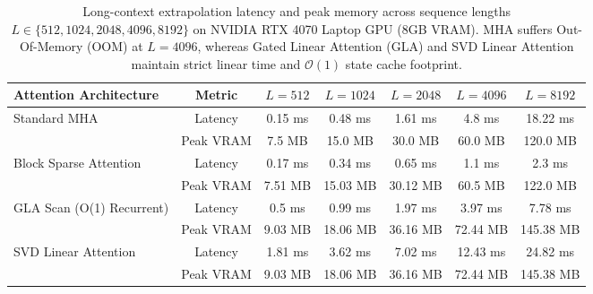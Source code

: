 
\begin{table}[t]
\centering
\caption{Long-context extrapolation latency and peak memory across sequence lengths $L \in \{512, 1024, 2048, 4096, 8192\}$ on NVIDIA RTX 4070 Laptop GPU (8GB VRAM). MHA suffers Out-Of-Memory (OOM) at $L=4096$, whereas Gated Linear Attention (GLA) and SVD Linear Attention maintain strict linear time and $\mathcal{O}(1)$ state cache footprint.}
\label{tab:long_context_scaling}
\small
\begin{tabular}{lcccccc}
\toprule
\textbf{Attention Architecture} & \textbf{Metric} & $L=512$ & $L=1024$ & $L=2048$ & $L=4096$ & $L=8192$ \\
\midrule
\multirow{2}{*}{Standard MHA} & Latency & 0.15 ms & 0.48 ms & 1.61 ms & 4.8 ms & 18.22 ms \\
 & Peak VRAM & 7.5 MB & 15.0 MB & 30.0 MB & 60.0 MB & 120.0 MB \\
\midrule
\multirow{2}{*}{Block Sparse Attention} & Latency & 0.17 ms & 0.34 ms & 0.65 ms & 1.1 ms & 2.3 ms \\
 & Peak VRAM & 7.51 MB & 15.03 MB & 30.12 MB & 60.5 MB & 122.0 MB \\
\midrule
\multirow{2}{*}{GLA Scan (O(1) Recurrent)} & Latency & 0.5 ms & 0.99 ms & 1.97 ms & 3.97 ms & 7.78 ms \\
 & Peak VRAM & 9.03 MB & 18.06 MB & 36.16 MB & 72.44 MB & 145.38 MB \\
\midrule
\multirow{2}{*}{SVD Linear Attention} & Latency & 1.81 ms & 3.62 ms & 7.02 ms & 12.43 ms & 24.82 ms \\
 & Peak VRAM & 9.03 MB & 18.06 MB & 36.16 MB & 72.44 MB & 145.38 MB \\
\bottomrule
\end{tabular}
\end{table}


